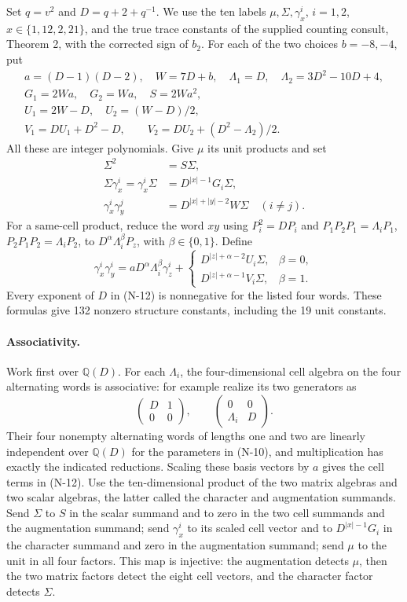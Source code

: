 Set $q=v^2$ and $D=q+2+q^{-1}$.  We use the ten labels
$\mu,\Sigma,\gamma^i_x$, $i=1,2$, $x\in\{1,12,2,21\}$,
and the true trace constants of the supplied counting consult,
Theorem 2, with the corrected sign of $b_2$.
For each of the two choices $b=-8,-4$, put
\[
\begin{gathered}
 a=(D-1)(D-2),\quad W=7D+b,\quad
 \Lambda_1=D,\quad\Lambda_2=3D^2-10D+4,\\
 G_1=2Wa,\quad G_2=Wa,\quad S=2Wa^2,\\
 U_1=2W-D,\quad U_2=(W-D)/2,\\
 V_1=DU_1+D^2-D,
 \qquad V_2=DU_2+(D^2-\Lambda_2)/2.
\end{gathered}
\tag{N-10}
\]
All these are integer polynomials.  Give $\mu$ its unit products and set
\[
\begin{split}
 \Sigma^2&=S\Sigma,\\
 \Sigma\gamma^i_x=\gamma^i_x\Sigma&=D^{|x|-1}G_i\Sigma,\\
 \gamma^i_x\gamma^j_y&=D^{|x|+|y|-2}W\Sigma\quad(i\ne j).
\end{split}
\tag{N-11}
\]
For a same-cell product, reduce the word $xy$ using
$P_i^2=DP_i$ and $P_1P_2P_1=\Lambda_iP_1$,
$P_2P_1P_2=\Lambda_iP_2$, to
$D^\alpha\Lambda_i^\beta P_z$, with $\beta\in\{0,1\}$.
Define
\[
 \gamma^i_x\gamma^i_y
  =aD^\alpha\Lambda_i^\beta\gamma^i_z+
 \begin{cases}
 D^{|z|+\alpha-2}U_i\Sigma,&\beta=0,\\
 D^{|z|+\alpha-1}V_i\Sigma,&\beta=1.
 \end{cases}
 \tag{N-12}
\]
Every exponent of $D$ in (N-12) is nonnegative for the listed four
words.  These formulas give 132 nonzero structure constants,
including the 19 unit constants.

\paragraph{Associativity.}
Work first over $\mathbb Q(D)$.  For each $\Lambda_i$, the four-dimensional
cell algebra on the four alternating words is associative: for example
realize its two generators as
\[
 \begin{pmatrix}D&1\\0&0\end{pmatrix},\qquad
 \begin{pmatrix}0&0\\\Lambda_i&D\end{pmatrix}.
\]
Their four nonempty alternating words of lengths one and two are
linearly independent over $\mathbb Q(D)$ for the parameters in (N-10),
and multiplication has exactly the indicated reductions.  Scaling
these basis vectors by $a$ gives the cell terms in (N-12).
Use the ten-dimensional product of the two matrix algebras and two scalar algebras, the latter called the character and augmentation summands. Send $\Sigma$ to
$S$ in the scalar summand and to zero in the two cell summands and the augmentation summand; send
$\gamma^i_x$ to its scaled cell vector and to
$D^{|x|-1}G_i$ in the character summand and zero in the augmentation summand; send $\mu$ to the unit in all four factors. This map is injective: the augmentation detects $\mu$, then the two matrix factors detect the eight cell vectors, and the character factor detects $\Sigma$.

